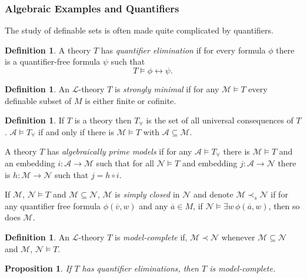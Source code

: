 \documentclass{amsart}
\newtheorem{proposition}[theorem]{Proposition}
\theoremstyle{definition}
\newtheorem{definition}[theorem]{Definition}
\numberwithin{equation}{section}
\begin{document}
\subsubsection{Algebraic Examples and Quantifiers}
The study of definable sets is often made quite complicated by quantifiers.

\begin{definition}
    A theory $T$ has \emph{quantifier elimination} if for every formula $\phi$ there is a quantifier-free formula $\psi$ such that 
    \[
    T \models \phi \leftrightarrow \psi.
    \]
\end{definition}

\begin{definition}
    An $\mathcal{L}$-theory $T$ is \emph{strongly minimal} if for any $\mathcal{M} \models T$ every definable subset of $M$ is either finite or cofinite.
\end{definition}

\begin{definition}
    If $T$ is a theory then $T_{\forall}$ is the set of all universal consequences of $T$.
    $\mathcal{A} \models T_{\forall}$ if and only if there is $\mathcal{M} \models T$ with $\mathcal{A} \subseteq \mathcal{M}$.

    A theory $T$ has \emph{algebraically prime models}
    if for any $\mathcal{A} \models T_{\forall}$ there is 
    $\mathcal{M} \models T$ and an embedding $i:\mathcal{A} \to \mathcal{M}$ such that for all $\mathcal{N} \models T$ and embedding $j: \mathcal{A} \to \mathcal{N}$ there is $h: \mathcal{M} \to \mathcal{N}$ such that $j = h \circ i$.

    If $\mathcal{M}$, $\mathcal{N} \models T$ and $\mathcal{M} \subseteq \mathcal{N}$,
    $\mathcal{M}$ is \emph{simply closed} in $\mathcal{N}$ and denote
    $\mathcal{M} \prec_s \mathcal{N}$ if for any quantifier free formula
    $\phi(\overline{v},w)$ and any $\overline{a} \in M$,
    if $\mathcal{N} \models \exists w\, \phi(\overline{a},w)$,
    then so does $\mathcal{M}$.
\end{definition}

\begin{definition}
    An $\mathcal{L}$-theory $T$ is \emph{model-complete} if,
    $\mathcal{M} \prec \mathcal{N}$ whenever
    $\mathcal{M} \subseteq \mathcal{N}$  and $\mathcal{M}$, $\mathcal{N} \models T$.
\end{definition}

\begin{proposition}
    If $T$ has quantifier eliminations,
    then $T$ is model-complete.
\end{proposition}
\end{document}

